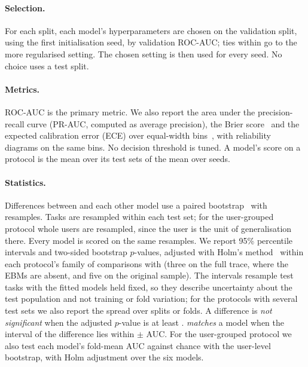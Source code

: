 \paragraph{Selection.} For each split, each model's hyperparameters are chosen on the validation split, using the first initialisation seed, by validation ROC-AUC; ties within  go to the more regularised setting. The chosen setting is then used for every seed. No choice uses a test split.

\paragraph{Metrics.} ROC-AUC is the primary metric. We also report the area under the precision-recall curve (PR-AUC, computed as average precision), the Brier score~\cite{brier1950verification} and the expected calibration error (ECE) over  equal-width bins~\cite{guo2017calibration}, with reliability diagrams on the same bins. No decision threshold is tuned. A model's score on a protocol is the mean over its test sets of the mean over seeds.

\paragraph{Statistics.} Differences between \kaam{} and each other model use a paired bootstrap~\cite{efron1993bootstrap} with  resamples. Tasks are resampled within each test set; for the user-grouped protocol whole users are resampled, since the user is the unit of generalisation there. Every model is scored on the same resamples. We report 95\% percentile intervals and two-sided bootstrap $p$-values, adjusted with Holm's method~\cite{holm1979simple} within each protocol's family of comparisons with \kaam{} (three on the full trace, where the EBMs are absent, and five on the original sample). The intervals resample test tasks with the fitted models held fixed, so they describe uncertainty about the test population and not training or fold variation; for the protocols with several test sets we also report the spread over splits or folds. A difference is \emph{not significant} when the adjusted $p$-value is at least . \kaam{} \emph{matches} a model when the interval of the difference lies within $\pm$ AUC. For the user-grouped protocol we also test each model's fold-mean AUC against chance with the user-level bootstrap, with Holm adjustment over the six models.
